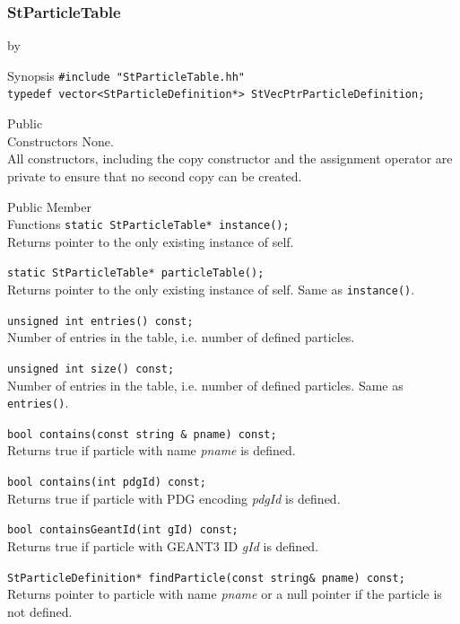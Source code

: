 \documentclass[twoside]{article}
\newcommand{\comp}[1]{\texttt{#1}}%
\newcommand{\args}[1]{\textit{#1}}%
\newcommand{\entrylabel}[1]{\mbox{\textbf{{#1}}}\hfil}%
\newenvironment{entry}
{\begin{list}{}%
    {\renewcommand{\makelabel}{\entrylabel}%
     \setlength{\labelwidth}{90pt}%
     \setlength{\leftmargin}{\labelwidth}
     \advance\leftmargin by \labelsep%
      }%
    }%
  {\end{list}}
\newcommand{\Entrylabel}[1]%
{\raisebox{0pt}[1ex][0pt]{\makebox[\labelwidth][l]%
    {\parbox[t]{\labelwidth}{\hspace{0pt}\textbf{{#1}}}}}}
\newenvironment{Entry}%
{\renewcommand{\entrylabel}{\Entrylabel}\begin{entry}}%
  {\end{entry}}
\begin{document}
\subsubsection{StParticleTable}
\begin{Entry}
\item[Synopsis]
    \verb+#include "StParticleTable.hh"+\\    
    \verb+typedef vector<StParticleDefinition*> StVecPtrParticleDefinition;+\\  
    
\item[Public\\ Constructors]
    None.\\
    All constructors, including the copy constructor
    and the assignment operator are private to ensure that
    no second copy can be created.
    
\item[Public Member\\ Functions]
    \verb+static StParticleTable* instance();+\\ 
    Returns pointer to the only existing instance of self.

    \verb+static StParticleTable* particleTable();+\\
    Returns pointer to the only existing instance of self.
    Same as \comp{instance()}.
    
    \verb+unsigned int entries() const;+\\
    Number of entries in the table, i.e. number of
    defined particles.
    
    \verb+unsigned int size() const;+\\ 
    Number of entries in the table, i.e. number of
    defined particles. Same as \comp{entries()}.
    
    \verb+bool contains(const string & pname) const;  +\\
    Returns true if particle with name \args{pname} is defined.
    
    \verb+bool contains(int pdgId) const;   +\\           
    Returns true if particle with PDG encoding \args{pdgId} is defined.
    
    \verb+bool containsGeantId(int gId) const; +\\      
    Returns true if particle with GEANT3 ID \args{gId} is defined.
    
    \verb+StParticleDefinition* findParticle(const string& pname) const;+\\
    Returns pointer to particle with name \args{pname} or a null
    pointer if the particle is not defined.
    

\end{Entry}
\end{document}
